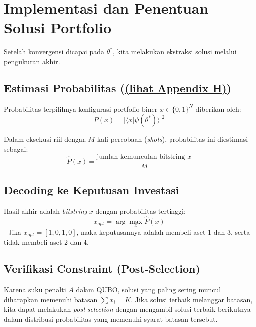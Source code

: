 \hypertarget{implementasi-dan-penentuan-solusi-portfolio}{%
\section{Implementasi dan Penentuan Solusi Portfolio}\label{implementasi-dan-penentuan-solusi-portfolio}}

Setelah konvergensi dicapai pada \(\theta^*\), kita melakukan ekstraksi solusi melalui pengukuran akhir.

\hypertarget{a.-estimasi-probabilitas-appendix-h}{%
\subsection{Estimasi Probabilitas (\hyperref[appendix-h]{(lihat Appendix H)})}\label{a.-estimasi-probabilitas-appendix-h}}

Probabilitas terpilihnya konfigurasi portfolio biner \(x \in \{0, 1\}^N\) diberikan oleh: \[ P(x) = |\langle x | \psi(\theta^*) \rangle|^2 \]

Dalam eksekusi riil dengan \(M\) kali percobaan (\emph{shots}), probabilitas ini diestimasi sebagai: \[ \hat{P}(x) = \frac{\text{jumlah kemunculan bitstring } x}{M} \]

\hypertarget{b.-decoding-ke-keputusan-investasi}{%
\subsection{Decoding ke Keputusan Investasi}\label{b.-decoding-ke-keputusan-investasi}}

Hasil akhir adalah \emph{bitstring} \(x\) dengan probabilitas tertinggi: \[ x_{opt} = \arg\max_x \hat{P}(x) \] - Jika \(x_{opt} = [1, 0, 1, 0]\), maka keputusannya adalah membeli aset 1 dan 3, serta tidak membeli aset 2 dan 4.

\hypertarget{c.-verifikasi-constraint-post-selection}{%
\subsection{Verifikasi Constraint (Post-Selection)}\label{c.-verifikasi-constraint-post-selection}}

Karena suku penalti \(A\) dalam QUBO, solusi yang paling sering muncul diharapkan memenuhi batasan \(\sum x_i = K\). Jika solusi terbaik melanggar batasan, kita dapat melakukan \emph{post-selection} dengan mengambil solusi terbaik berikutnya dalam distribusi probabilitas yang memenuhi syarat batasan tersebut.
